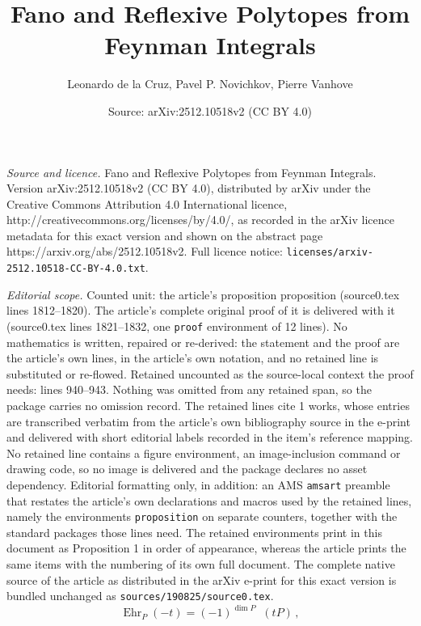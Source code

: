 \documentclass[10pt,a4paper]{amsart}
\title{Fano and Reflexive Polytopes from Feynman Integrals}
\author{Leonardo de la Cruz, Pavel P. Novichkov, Pierre Vanhove}
\date{Source: arXiv:2512.10518v2 (CC BY 4.0)}
\DeclareMathOperator{\ehr}{Ehr}
\DeclareMathOperator{\nint}{N_{\mathrm{int}}}
\begin{document}
\maketitle

\noindent\emph{Source and licence.} Fano and Reflexive Polytopes from Feynman Integrals. Version arXiv:2512.10518v2 (CC BY 4.0), distributed by arXiv under the Creative Commons Attribution 4.0 International licence, http://creativecommons.org/licenses/by/4.0/, as recorded in the arXiv licence metadata for this exact version and shown on the abstract page https://arxiv.org/abs/2512.10518v2. Full licence notice: \texttt{licenses/arxiv-2512.10518-CC-BY-4.0.txt}.\par\smallskip

\noindent\textit{Editorial scope.} Counted unit: the article's proposition proposition (source0.tex lines 1812--1820). The article's complete original proof of it is delivered with it (source0.tex lines 1821--1832, one \texttt{proof} environment of 12 lines). No mathematics is written, repaired or re-derived: the statement and the proof are the article's own lines, in the article's own notation, and no retained line is substituted or re-flowed.  Retained uncounted as the source-local context the proof needs: lines 940--943.  Nothing was omitted from any retained span, so the package carries no omission record.  The retained lines cite 1 works, whose entries are transcribed verbatim from the article's own bibliography source in the e-print and delivered with short editorial labels recorded in the item's reference mapping.  No retained line contains a figure environment, an image-inclusion command or drawing code, so no image is delivered and the package declares no asset dependency.  Editorial formatting only, in addition: an AMS \texttt{amsart} preamble that restates the article's own declarations and macros used by the retained lines, namely the environments \texttt{proposition} on separate counters, together with the standard packages those lines need.  The retained environments print in this document as Proposition 1 in order of appearance, whereas the article prints the same items with the numbering of its own full document.  The complete native source of the article as distributed in the arXiv e-print for this exact version is bundled unchanged as \texttt{sources/190825/source0.tex}.
\begin{equation}
\label{eq:n_int_ehr}
 \ehr_P(-t) = (-1)^{\dim P} \nint(tP) \, ,
\end{equation}
\end{document}
